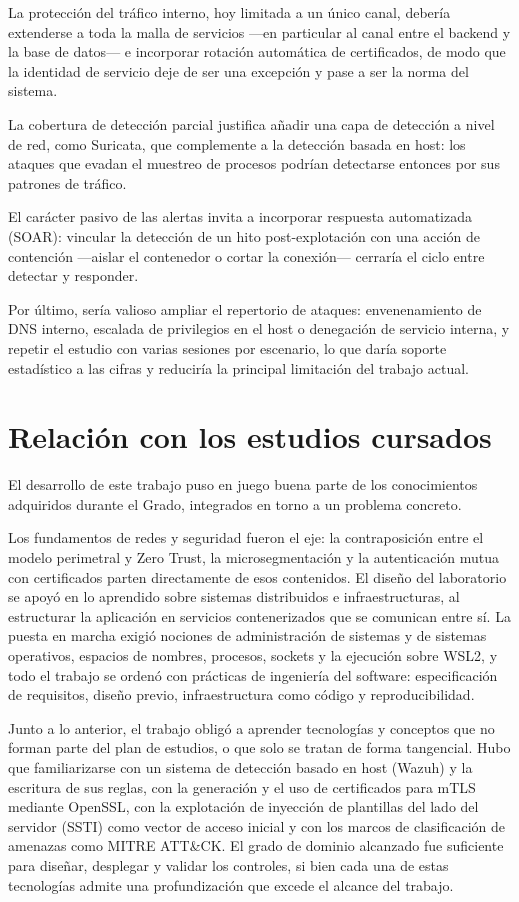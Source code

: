\documentclass[11pt,spanish,listoffigures,listoftables]{tfgetsinf}
\begin{document}
        La protección del tráfico interno, hoy limitada a un único canal, debería extenderse a toda la malla de servicios —en particular al canal entre el backend y la base de datos— e incorporar rotación automática de certificados, de modo que la identidad de servicio deje de ser una excepción y pase a ser la norma del sistema.
        
        La cobertura de detección parcial justifica añadir una capa de detección a nivel de red, como Suricata, que complemente a la detección basada en host: los ataques que evadan el muestreo de procesos podrían detectarse entonces por sus patrones de tráfico.
        
        El carácter pasivo de las alertas invita a incorporar respuesta automatizada (SOAR): vincular la detección de un hito post-explotación con una acción de contención —aislar el contenedor o cortar la conexión— cerraría el ciclo entre detectar y responder.
        
        Por último, sería valioso ampliar el repertorio de ataques: envenenamiento de DNS interno, escalada de privilegios en el host o denegación de servicio interna, y repetir el estudio con varias sesiones por escenario, lo que daría soporte estadístico a las cifras y reduciría la principal limitación del trabajo actual.

        \section{Relación con los estudios cursados}
        El desarrollo de este trabajo puso en juego buena parte de los conocimientos adquiridos durante el Grado, integrados en torno a un problema concreto. 

        Los fundamentos de redes y seguridad fueron el eje: la contraposición entre el modelo perimetral y Zero Trust, la microsegmentación y la autenticación mutua con certificados parten directamente de esos contenidos. El diseño del laboratorio se apoyó en lo aprendido sobre sistemas distribuidos e infraestructuras, al estructurar la aplicación en servicios contenerizados que se comunican entre sí. La puesta en marcha exigió nociones de administración de sistemas y de sistemas operativos, espacios de nombres, procesos, sockets y la ejecución sobre WSL2, y todo el trabajo se ordenó con prácticas de ingeniería del software: especificación de requisitos, diseño previo, infraestructura como código y reproducibilidad.
        
        Junto a lo anterior, el trabajo obligó a aprender tecnologías y conceptos que no forman parte del plan de estudios, o que solo se tratan de forma tangencial. Hubo que familiarizarse con un sistema de detección basado en host (Wazuh) y la escritura de sus reglas, con la generación y el uso de certificados para mTLS mediante OpenSSL, con la explotación de inyección de plantillas del lado del servidor (SSTI) como vector de acceso inicial y con los marcos de clasificación de amenazas como MITRE ATT&CK. El grado de dominio alcanzado fue suficiente para diseñar, desplegar y validar los controles, si bien cada una de estas tecnologías admite una profundización que excede el alcance del trabajo.
        
\end{document}
